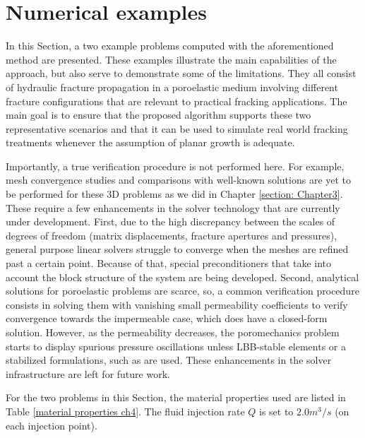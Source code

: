 \section{Numerical examples}
\label{section: Chapter4/examples}

In this Section, a two example problems computed with the aforementioned method are presented. These examples illustrate the main capabilities of the approach, but also serve to demonstrate some of the limitations. They all consist of hydraulic fracture propagation in a poroelastic medium involving different fracture configurations that are relevant to practical fracking applications. The main goal is to ensure that the proposed algorithm supports these two representative scenarios and that it can be used to simulate real world fracking treatments whenever the assumption of planar growth is adequate. 

Importantly, a true verification procedure is not performed here. For example, mesh convergence studies and comparisons with well-known solutions are yet to be performed for these 3D problems as we did in Chapter \ref{section: Chapter3}. These require a few enhancements in the solver technology that are currently under development. First, due to the high discrepancy between the scales of degrees of freedom (matrix displacements, fracture apertures and pressures), general purpose linear solvers struggle to converge when the meshes are refined past a certain point. Because of that, special preconditioners that take into account the block structure of the system are being developed. Second, analytical solutions for poroelastic problems are scarce, so, a common verification procedure consists in solving them with vanishing small permeability coefficients to verify convergence towards the impermeable case, which does have a closed-form solution. However, as the permeability decreases, the poromechanics problem starts to display spurious pressure oscillations unless LBB-stable elements \cite{arnold1984stable} or a stabilized formulations, such as \cite{white2008stabilized} are used. These enhancements in the solver infrastructure are left for future work.

For the two problems in this Section, the material properties used are listed in Table \ref{material properties ch4}. The fluid injection rate $Q$ is set to $2.0 m^3/s$ (on each injection point).

